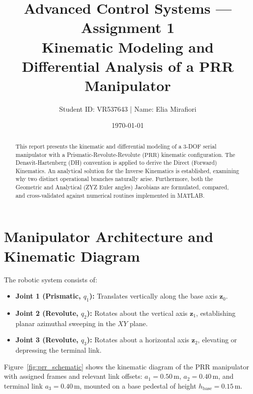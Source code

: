 \documentclass[11pt, a4paper]{article}
\title{\textbf{Advanced Control Systems --- Assignment 1\\Kinematic Modeling and Differential Analysis of a PRR Manipulator}}
\author{Student ID: VR537643 \quad | \quad Name: Elia Mirafiori}
\date{\today}
\begin{document}
\maketitle

\begin{abstract}
This report presents the kinematic and differential modeling of a 3-DOF serial manipulator with a Prismatic-Revolute-Revolute ($\mathrm{PRR}$) kinematic configuration. The Denavit-Hartenberg (DH) convention is applied to derive the Direct (Forward) Kinematics. An analytical solution for the Inverse Kinematics is established, examining why two distinct operational branches naturally arise. Furthermore, both the Geometric and Analytical (ZYZ Euler angles) Jacobians are formulated, compared, and cross-validated against numerical routines implemented in MATLAB.
\end{abstract}

\section{Manipulator Architecture and Kinematic Diagram}
The robotic system consists of:
\begin{itemize}
    \item \textbf{Joint 1 (Prismatic, $q_1$):} Translates vertically along the base axis $\mathbf{z}_0$.
    \item \textbf{Joint 2 (Revolute, $q_2$):} Rotates about the vertical axis $\mathbf{z}_1$, establishing planar azimuthal sweeping in the $XY$ plane.
    \item \textbf{Joint 3 (Revolute, $q_3$):} Rotates about a horizontal axis $\mathbf{z}_2$, elevating or depressing the terminal link.
\end{itemize}

Figure~\ref{fig:prr_schematic} shows the kinematic diagram of the PRR manipulator with assigned frames and relevant link offsets: $a_1 = 0.50\,\text{m}$, $a_2 = 0.40\,\text{m}$, and terminal link $a_3 = 0.40\,\text{m}$, mounted on a base pedestal of height $h_{\text{base}} = 0.15\,\text{m}$.
\end{document}
